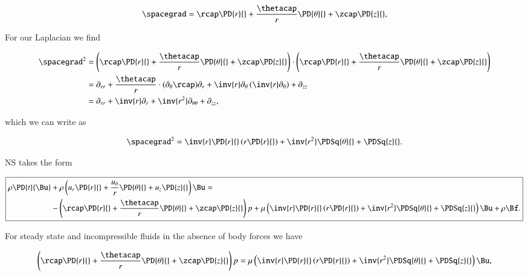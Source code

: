 \begin{equation}\label{eqn:classicalMechanicsPs2:610}
\spacegrad = 
\rcap \PD{r}{} + 
\frac{\thetacap}{r} \PD{\theta}{} + 
\zcap \PD{z}{},
\end{equation}

For our Laplacian we find

\begin{align*}
\spacegrad^2 &= 
\left(
\rcap \PD{r}{} + 
\frac{\thetacap}{r} \PD{\theta}{} + 
\zcap \PD{z}{}
\right)
 \cdot
\left(
\rcap \PD{r}{} + 
\frac{\thetacap}{r} \PD{\theta}{} + 
\zcap \PD{z}{}
\right) \\
&=
\partial_{rr} 
+ \frac{\thetacap}{r} \cdot (\partial_\theta \rcap) \partial_r
+ \inv{r} \partial_\theta \left( \inv{r} \partial_\theta \right)
+ \partial_{zz} \\
&=
\partial_{rr} + \inv{r} \partial_r + \inv{r^2} \partial_{\theta\theta} + \partial_{zz},
\end{align*}

which we can write as

\begin{equation}\label{eqn:continuumL12:630}
\spacegrad^2 = \inv{r} \PD{r}{} \left( r \PD{r}{} \right) + \inv{r^2} \PDSq{\theta}{} + \PDSq{z}{}.
\end{equation}

NS takes the form

\begin{equation}\label{eqn:classicalMechanicsPs2:650}
\boxed{
\begin{aligned}
\rho \PD{t}{\Bu} &+ \rho 
\left(
u_r \PD{r}{} + 
\frac{u_\theta}{r} \PD{\theta}{} + 
u_z \PD{z}{} \right) \Bu 
=  \\
&- 
\left(
\rcap \PD{r}{} + 
\frac{\thetacap}{r} \PD{\theta}{} + 
\zcap \PD{z}{}
\right)
p + \mu \left(
\inv{r} \PD{r}{} \left( r \PD{r}{} \right) + \inv{r^2} \PDSq{\theta}{} + \PDSq{z}{} \right)
\Bu + \rho \Bf.
\end{aligned}
}
\end{equation}

For steady state and incompressible fluids in the absence of body forces we have

\begin{equation}\label{eqn:continuumL12:670}
\left(
\rcap \PD{r}{} + 
\frac{\thetacap}{r} \PD{\theta}{} + 
\zcap \PD{z}{}
\right)
p = \mu \left(
\inv{r} \PD{r}{} \left( r \PD{r}{} \right) + \inv{r^2} \PDSq{\theta}{} + \PDSq{z}{} \right)
\Bu,
\end{equation}

